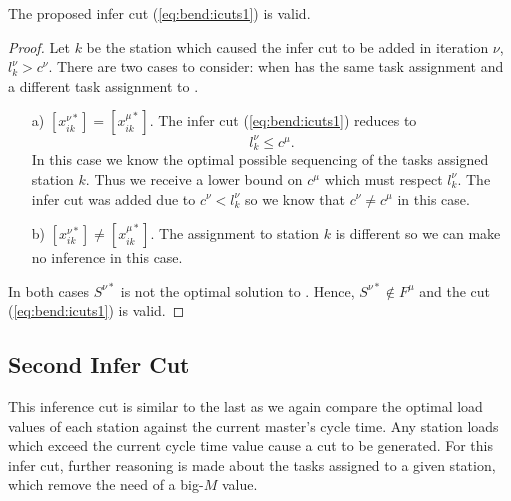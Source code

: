 \begin{theorem}
	The proposed infer cut (\ref{eq:bend:icuts1}) is valid.
\end{theorem}
\begin{proof}
	Let $k$ be the station which caused the infer cut to
	be added in iteration $\nu$, \ie $l_k^\nu>c^\nu$.
	There are two cases to consider: when \rmp{\mu} has the 
	same task assignment and a different task assignment to \rmp{\nu}.
	\begin{itemize}
		\item[a)] $[x_{ik}^{\nu*}] = [x_{ik}^{\mu*}]$.
		The infer cut (\ref{eq:bend:icuts1}) reduces to
		\[ l_k^\nu \leq c^\mu. \]
		In this case we know the optimal possible sequencing
		of the tasks assigned station $k$.
		Thus we receive a lower bound on
		$c^\mu$ which must respect $l_k^\nu$.
		The infer cut was added due to $c^\nu<l_k^\nu$
		so we know that $c^\nu\neq c^\mu$ in this case.
		\item[b)] $[x_{ik}^{\nu*}] \neq [x_{ik}^{\mu*}]$.
		The assignment to station $k$ is different so we can
		make no inference in this case.
	\end{itemize}
	In both cases $S^{\nu*}$ is not the optimal
	solution to \rmp{\mu}.
	Hence, $S^{\nu*}\not\in F^\mu$ and the cut (\ref{eq:bend:icuts1}) is valid.
\end{proof}

\subsection{Second Infer Cut}
\label{sec:bend:Icuts2}
This inference cut is similar to the last
as we again compare the optimal load values
of each station against the current master's cycle time.
Any station loads which exceed the current cycle time value
cause a cut to be generated.
For this infer cut, further reasoning is made about
the tasks assigned to a given station, which remove
the need of a big-$M$ value.


